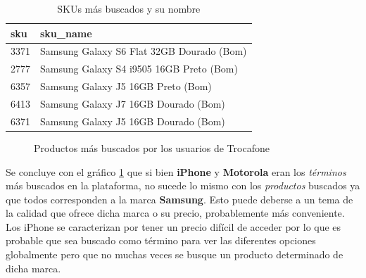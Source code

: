 \documentclass[a4paper]{article}
\begin{document}
\begin{table}[!h]
	\begin{center}
		\begin{tabular}{|l|l|}
			\hline
			sku & sku\_name \\
			\hline \hline
			3371 & Samsung Galaxy S6 Flat 32GB Dourado (Bom) \\ \hline			
			2777 & Samsung Galaxy S4 i9505 16GB Preto (Bom) \\ \hline
			6357 & Samsung Galaxy J5 16GB Preto (Bom) \\ \hline
			6413 & Samsung Galaxy J7 16GB Dourado (Bom) \\ \hline
			6371 & Samsung Galaxy J5 16GB Dourado (Bom) \\ \hline
		\end{tabular}
		\caption{SKUs más buscados y su nombre}
		\label{table:sencilla}
	\end{center}
\end{table}

\begin{figure}[!h]
	\caption{Productos más buscados por los usuarios de Trocafone}
	\label{fig:searchedproduct}
\end{figure}

Se concluye con el gráfico \ref{fig:searchedproduct} que si bien \textbf{iPhone} y \textbf{Motorola} eran los \textit{términos} más buscados en la plataforma, no sucede lo mismo con los \textit{productos} buscados ya que todos corresponden a la marca \textbf{Samsung}. Esto puede deberse a un tema de la calidad que ofrece dicha marca o su precio, probablemente más conveniente. Los iPhone se caracterizan por tener un precio difícil de acceder por lo que es probable que sea buscado como término para ver las diferentes opciones globalmente pero que no muchas veces se busque un producto determinado de dicha marca.
\end{document}

